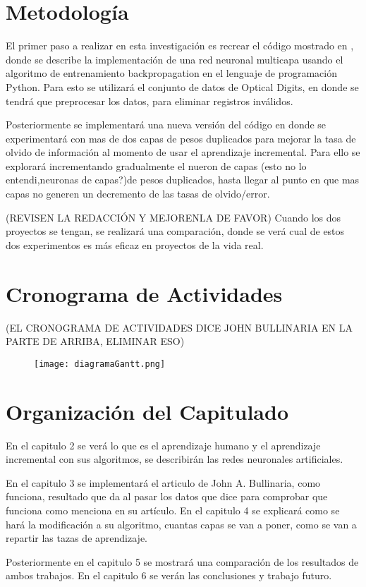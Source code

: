 \section{Metodología}
    El primer paso a realizar en esta investigación es recrear el código mostrado en \cite{bullinaria2009}, donde se describe la implementación de una red  neuronal multicapa usando el algoritmo de entrenamiento backpropagation en el lenguaje de programación Python.  Para esto se utilizará el conjunto de datos de Optical Digits,  en donde se tendrá que preprocesar los datos, para eliminar registros inválidos. 

    Posteriormente se implementará una nueva versión del código en donde se experimentará con mas de dos capas de pesos duplicados para mejorar la tasa de olvido de información al momento de usar el aprendizaje incremental.  Para ello se explorará incrementando gradualmente el nueron de capas (esto no lo entendi,neuronas de capas?)de pesos duplicados, hasta llegar al punto en que mas capas no generen un decremento de las tasas de olvido/error.

(REVISEN LA REDACCIÓN Y MEJORENLA DE FAVOR)
    Cuando los dos proyectos se tengan, se realizar\'a una comparación, donde se ver\'a cual de estos dos experimentos
    es más eficaz en proyectos de la vida real.
    
\section{Cronograma de Actividades}
(EL CRONOGRAMA DE ACTIVIDADES DICE JOHN BULLINARIA EN LA PARTE DE ARRIBA, ELIMINAR ESO)

    \begin{figure}[H]
        \centering
        \texttt{[image: diagramaGantt.png]}
        \label{fig:fig3}
    \end{figure}

\section{Organización del Capitulado}


	En el capitulo 2 se ver\'a lo que es el aprendizaje humano y el aprendizaje incremental con sus algoritmos, se describirán las redes neuronales artificiales.

En el capitulo 3 se implementar\'a el articulo de John A. Bullinaria, como funciona, resultado que da al pasar los datos que dice para comprobar que funciona como menciona en su art\'iculo. En el capitulo 4 se explicar\'a como se hará la modificación a su algoritmo, cuantas capas se van a poner, como se van a repartir las tazas de aprendizaje.

Posteriormente en el capitulo 5 se mostrar\'a una comparación de los resultados de ambos trabajos. En el capitulo 6 se verán las conclusiones y trabajo futuro.
